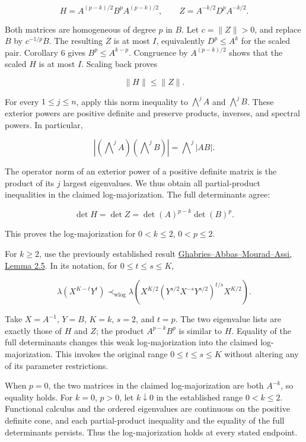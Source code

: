 \documentclass[10pt,a4paper]{article}
\begin{document}
\[
H=A^{(p-k)/2}B^pA^{(p-k)/2},\qquad
Z=A^{-k/2}D^pA^{-k/2}.
\]

Both matrices are homogeneous of degree \(p\) in \(B\). Let
\(c=\|Z\|>0\), and replace \(B\) by \(c^{-1/p}B\). The resulting \(Z\)
is at most \(I\), equivalently \(D^p\le A^k\) for the scaled pair.
Corollary 6 gives \(B^p\le A^{k-p}\). Congruence by \(A^{(p-k)/2}\)
shows that the scaled \(H\) is at most \(I\). Scaling back proves

\[
\|H\|\le\|Z\|.
\]

For every \(1\le j\le n\), apply this norm inequality to
\(\bigwedge^j A\) and \(\bigwedge^j B\). These exterior powers are
positive definite and preserve products, inverses, and spectral powers.
In particular,

\[
\left|(\bigwedge\nolimits^j A)(\bigwedge\nolimits^j B)\right|
=\bigwedge\nolimits^j |AB|.
\]

The operator norm of an exterior power of a positive definite matrix is
the product of its \(j\) largest eigenvalues. We thus obtain all
partial-product inequalities in the claimed log-majorization. The full
determinants agree:

\[
\det H=\det Z=\det(A)^{p-k}\det(B)^p.
\]

This proves the log-majorization for \(0<k\le2\), \(0<p\le2\).

For \(k\ge2\), use the previously established result
\href{https://www.researchgate.net/publication/342908148_A_proof_of_a_conjectured_determinantal_inequality}{Ghabries--Abbas--Mourad--Assi,
Lemma 2.5}. In its notation, for \(0\le t\le s\le K\),

\[
\lambda(X^{K-t}Y^t)
\prec_{\mathrm{wlog}}
\lambda\!\left(
X^{K/2}(Y^{s/2}X^{-s}Y^{s/2})^{t/s}X^{K/2}\right).
\]

Take \(X=A^{-1}\), \(Y=B\), \(K=k\), \(s=2\), and \(t=p\). The two
eigenvalue lists are exactly those of \(H\) and \(Z\); the product
\(A^{p-k}B^p\) is similar to \(H\). Equality of the full determinants
changes this weak log-majorization into the claimed log-majorization.
This invokes the original range \(0\le t\le s\le K\) without altering
any of its parameter restrictions.

When \(p=0\), the two matrices in the claimed log-majorization are both
\(A^{-k}\), so equality holds. For \(k=0\), \(p>0\), let
\(k\downarrow0\) in the established range \(0<k\le2\). Functional
calculus and the ordered eigenvalues are continuous on the positive
definite cone, and each partial-product inequality and the equality of
the full determinants persists. Thus the log-majorization holds at every
stated endpoint.
\end{document}

